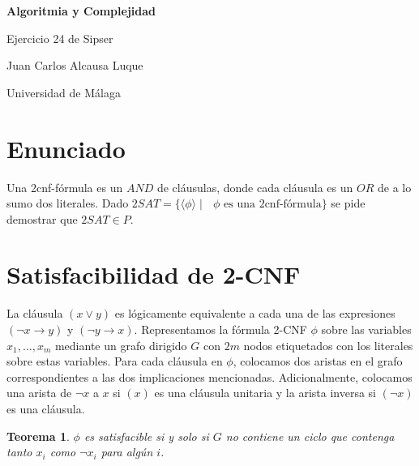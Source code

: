 \documentclass[a4paper,12pt]{article}
\newtheorem{theorem}{Teorema}
\begin{document}
\begin{titlepage}
    \centering
    \vspace*{\fill} %
    {\Huge \bfseries Algoritmia y Complejidad\par}
    \vspace{1cm}
	{\huge Ejercicio 24 de Sipser\par}
	\vspace{1cm}
    {\Large Juan Carlos Alcausa Luque \par}
    \vspace{1cm}
    \vspace*{\fill} %
    {\large Universidad de Málaga \par}
\end{titlepage}


\tableofcontents
\newpage


\section{Enunciado}
Una 2cnf-fórmula es un $AND$ de cláusulas, donde cada cláusula es un $OR$ de a lo sumo dos literales. Dado $2SAT = \{\langle \phi \rangle \mid \text{ } \phi \text{ es una 2cnf-fórmula} \}$ se pide demostrar que $2SAT \in P$.

\section{Satisfacibilidad de 2-CNF}

La cláusula $(x \lor y)$ es lógicamente equivalente a cada una de las expresiones $(\neg x \rightarrow y)$ y $(\neg y \rightarrow x)$. Representamos la fórmula 2-CNF $\phi$ sobre las variables $x_1, \ldots, x_m$ mediante un grafo dirigido $G$ con $2m$ nodos etiquetados con los literales sobre estas variables. Para cada cláusula en $\phi$, colocamos dos aristas en el grafo correspondientes a las dos implicaciones mencionadas. Adicionalmente, colocamos una arista de $\neg x$ a $x$ si $(x)$ es una cláusula unitaria y la arista inversa si $(\neg x)$ es una cláusula.

\begin{theorem}
$\phi$ es satisfacible si y solo si $G$ no contiene un ciclo que contenga tanto $x_i$ como $\neg x_i$ para algún $i$. 
\end{theorem}
\end{document}

